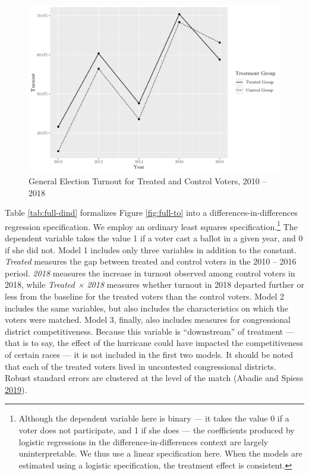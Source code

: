 \documentclass[
  12pt,
]{article}
\begin{document}
\begin{figure}[H]

{\centering \includegraphics{hurricane_michael_files/figure-latex/full-to-chunk-1} 

}

\caption{\label{fig:full-to}General Election Turnout for Treated and Control Voters, 2010 -- 2018}\label{fig:full-to-chunk}
\end{figure}

Table \ref{tab:full-dind} formalizes Figure \ref{fig:full-to} into a differences-in-differences regression specification. We employ an ordinary least squares specification.\footnote{Although the dependent variable here is binary --- it takes the value 0 if a voter does not participate, and 1 if she does --- the coefficients produced by logistic regressions in the difference-in-differences context are largely uninterpretable. We thus use a linear specification here. When the models are estimated using a logistic specification, the treatment effect is consistent.} The dependent variable takes the value 1 if a voter cast a ballot in a given year, and 0 if she did not. Model 1 includes only three variables in addition to the constant. \emph{Treated} measures the gap between treated and control voters in the 2010 -- 2016 period. \emph{2018} measures the increase in turnout observed among control voters in 2018, while \emph{Treated × 2018} measures whether turnout in 2018 departed further or less from the baseline for the treated voters than the control voters. Model 2 includes the same variables, but also includes the characteristics on which the voters were matched. Model 3, finally, also includes measures for congressional district competitiveness. Because this variable is ``downstream'' of treatment --- that is to say, the effect of the hurricane could have impacted the competitiveness of certain races --- it is not included in the first two models. It should be noted that each of the treated voters lived in uncontested congressional districts. Robust standard errors are clustered at the level of the match (Abadie and Spiess \protect\hyperlink{ref-Abadie2019}{2019}).
\end{document}
